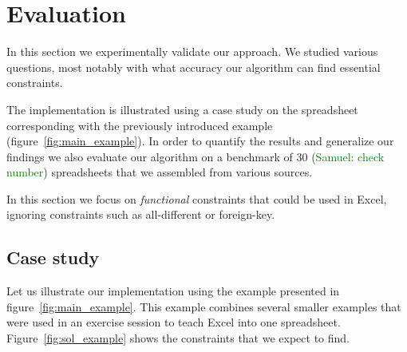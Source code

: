 \documentclass{ecai}
\newcommand{\sergey}[1]{\textcolor{magenta}{{\sc Sergey:} #1}\xspace}
\newcommand{\samuel}[1]{\textcolor{green}{{\sc Samuel:} #1}\xspace}
\begin{document}


\section{Evaluation}
In this section we experimentally validate our approach.
We studied various questions, most notably with what accuracy our algorithm can find essential constraints.

The implementation is illustrated using a case study on the spreadsheet corresponding with the previously introduced example (figure~\ref{fig:main_example}).
In order to quantify the results and generalize our findings we also evaluate our algorithm on a benchmark of 30 (\samuel{check number}) spreadsheets that we assembled from various sources.

In this section we focus on \textit{functional} constraints that could be used in Excel, ignoring constraints such as all-different or foreign-key.

\subsection{Case study}
Let us illustrate our implementation using the example presented in figure~\ref{fig:main_example}.
This example combines several smaller examples that were used in an exercise session to teach Excel into one spreadsheet.
Figure~\ref{fig:sol_example} shows the constraints that we expect to find.
\end{document}
